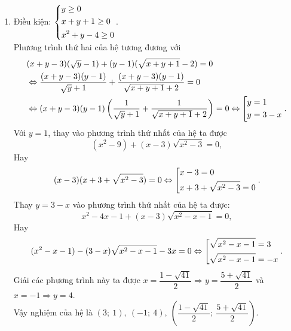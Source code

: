 \begin{ex}
{\begin{enumerate}
        \item Điều kiện: $\left\{\begin{aligned}  & y\ge 0 \\  & x+y+1\ge 0 \\  & {{x}^{2}}+y-4\ge 0 \end{aligned}\right.$.\\
        Phương trình thứ hai của hệ tương đương với 
        $$\begin{aligned} & (x+y-3)(\sqrt{y}-1)+(y-1)(\sqrt{x+y+1}-2)=0 \\& \Leftrightarrow \dfrac{(x+y-3)(y-1)}{\sqrt{y}+1}+\dfrac{(x+y-3)(y-1)}{\sqrt{x+y+1}+2}=0 \\& \Leftrightarrow (x+y-3)(y-1)\left( \dfrac{1}{\sqrt{y}+1}+\dfrac{1}{\sqrt{x+y+1}+2} \right)=0 \Leftrightarrow \left[\begin{aligned}  & y=1 \\ 
 & y=3-x \end{aligned}\right. . \end{aligned}$$
Với $y=1$, thay vào phương trình thứ nhất của hệ ta được
\[(x^2-9)+(x-3)\sqrt{x^2-3}=0,\]
Hay 
\[ (x-3)(x+3+\sqrt{x^2-3})=0 \Leftrightarrow \left[\begin{aligned}  & x-3=0 \\  & x+3+\sqrt{x^2-3}=0\end{aligned}\right..\]
Thay $y = 3 - x$ vào phương trình thứ nhất của hệ ta được: 
$$x^2-4x-1+(x-3)\sqrt{x^2-x-1}=0,$$
Hay 
$$ (x^2-x-1)-(3-x)\sqrt{x^2-x-1}-3x=0 \Leftrightarrow \left[\begin{aligned}  & \sqrt{x^2-x-1}=3 \\ 
 & \sqrt{x^2-x-1}=-x \end{aligned}\right..$$
 Giải các phương trình này ta được $x=\dfrac{1-\sqrt{41}}{2}\Rightarrow y=\dfrac{5+\sqrt{41}}{2}$ và $x=-1 \Rightarrow y=4$.\\
 Vậy nghiệm của hệ là $(3;\ 1),\  (-1;\ 4),\  \left(\dfrac{1-\sqrt{41}}{2};\ \dfrac{5+\sqrt{41}}{2}\right).$
    \end{enumerate}
    }
\end{ex}

